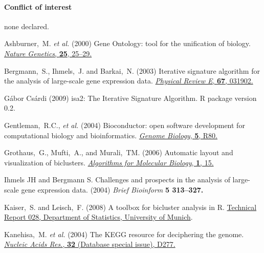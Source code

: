 \documentclass[round]{bioinfo}
\begin{document}
\paragraph{Conflict of interest\textcolon} none declared.

\begin{thebibliography}{6}

Ashburner,~M. \emph{et al.} (2000)
Gene Ontology: tool for the unification of biology.
\href{http://dx.doi.org/10.1038/75556}{\emph{Nature Genetics}, {\bf 25}, 25--29.}

Bergmann,~S., Ihmels,~J. and Barkai,~N. (2003)
Iterative signature algorithm for the analysis of large-scale gene expression data.
\href{http://dx.doi.org/10.1103/PhysRevE.67.031902 }{\emph{Physical Review E}, {\bf 67}, 031902.}


G\'abor Cs\'ardi (2009)
isa2: The Iterative Signature Algorithm. 
{R package version 0.2.}

Gentleman,~R.C., \emph{et al.} (2004)
Bioconductor: open software development for computational biology and bioinformatics.
\href{http://dx.doi.org/10.1186/gb-2004-5-10-r80}{\emph{Genome Biology}, {\bf 5}, R80.}

Grothaus,~G., Mufti,~A., and Murali,~TM. (2006)
Automatic layout and visualization of biclusters.
\href{http://dx.doi.org/10.1186/1748-7188-1-15}{\emph{Algorithms for Molecular Biology}, {\bf 1}, 15.}

Ihmels JH and Bergmann S. Challenges and prospects in the analysis
of large-scale gene expression data. (2004)
{\emph{Brief Bioinform} \bf{5} 313--327.}

Kaiser,~S. and Leisch,~F. (2008)
A toolbox for bicluster analysis in R.
\href{http://epub.ub.uni-muenchen.de/3293/}{Technical Report 028, Department of Statistics, University of Munich}.

Kanehisa,~M. \emph{et al.} (2004)
The KEGG resource for deciphering the genome.
\href{http://dx.doi.org/10.1093/nar/gkh063}{\emph{Nucleic Acids Res.}, {\bf 32} (Database special issue), D277.}


\end{thebibliography}
\end{document}
